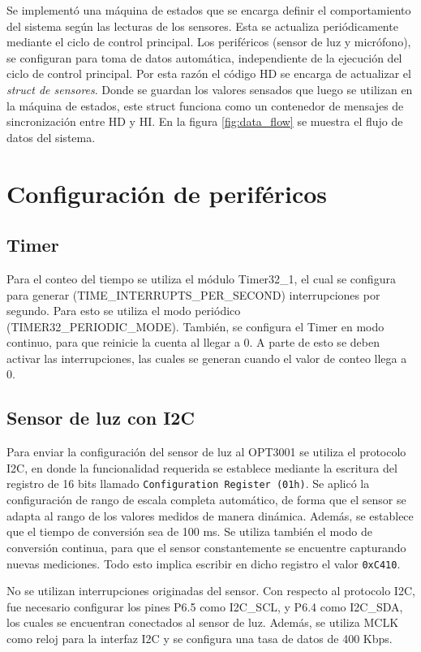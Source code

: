 Se implementó una máquina de estados que se encarga definir el comportamiento del sistema según las
lecturas de los sensores. Esta se actualiza periódicamente mediante el ciclo de control
principal. Los periféricos (sensor de luz y micrófono), se configuran para toma de datos automática,
independiente de la ejecución del ciclo de control principal. Por esta razón el código HD se encarga
de actualizar el \textit{struct de sensores}. Donde se guardan los valores sensados que luego se
utilizan en la máquina de estados, este struct funciona como un contenedor de mensajes de
sincronización entre HD y HI. En la figura \ref{fig:data_flow} se muestra el flujo de datos del sistema.


\section{Configuración de periféricos}

\subsection{Timer}
Para el conteo del tiempo se utiliza el módulo Timer32\_1, el cual se configura para generar
(TIME\_INTERRUPTS\_PER\_SECOND) interrupciones por segundo. Para esto se utiliza el modo periódico
(TIMER32\_PERIODIC\_MODE). También, se configura el Timer en modo continuo, para que reinicie la
cuenta al llegar a 0. A parte de esto se deben activar las interrupciones, las cuales se generan
cuando el valor de conteo llega a 0.

\subsection{Sensor de luz con I2C}
Para enviar la configuración del sensor de luz al OPT3001 se utiliza el protocolo I2C, en donde la
funcionalidad requerida se establece mediante la escritura del registro de 16 bits llamado
\texttt{Configuration Register (01h)}. Se aplicó la configuración de rango de escala completa
automático, de forma que el sensor se adapta al rango de los valores medidos de manera
dinámica. Además, se establece que el tiempo de conversión sea de 100 ms. Se utiliza también el modo
de conversión continua, para que el sensor constantemente se encuentre capturando nuevas
mediciones. Todo esto implica escribir en dicho registro el valor \texttt{0xC410}.

No se utilizan interrupciones originadas del sensor.  Con respecto al protocolo I2C, fue necesario
configurar los pines P6.5 como I2C\_SCL, y P6.4 como I2C\_SDA, los cuales se encuentran conectados
al sensor de luz. Además, se utiliza MCLK como reloj para la interfaz I2C y se configura una tasa de
datos de 400 Kbps.

